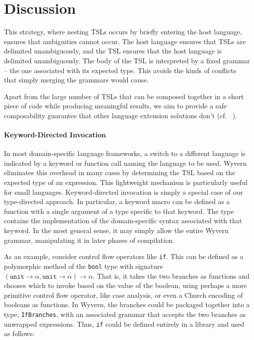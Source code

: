 
\section{Discussion}\label{s:discussion}

 This strategy, where nesting TSLs occurs by briefly entering the host language, ensures that ambiguities cannot occur. The host language ensures that TSLs are delimited unambiguously, and the TSL ensures that the host language is delimited unambiguously. The body of the TSL is interpreted by a fixed grammar -- the one associated with its expected type. This avoids the kinds of conflicts that simply merging the grammars would cause. %

Apart from the large number of TSLs that can be composed together in a short
piece of code while producing meaningful results, we aim to provide a safe
composability guarantee that other language extension solutions don't
(cf.~\cite{Erdweg:2013:FEL:2517208.2517210} ).

\paragraph{Keyword-Directed Invocation}

In most domain-specific language frameworks, a switch to a different language is indicated by a keyword or function call naming the language to be used. Wyvern eliminates this overhead in many cases by determining the TSL based on the expected type of an expression. This lightweight mechanism is particularly useful for small languages.
Keyword-directed invocation is simply a special case of our type-directed approach. In particular, a keyword macro can be defined as a function with a single argument of a type specific to that keyword. The type contains the implementation of the domain-specific syntax associated with that keyword. In the most general sense, it may simply allow the entire Wyvern
grammar, manipulating it in later phases of compilation. 

As an example, consider control flow operators like \verb|if|. This can be defined as a polymorphic method of the \verb|bool| type with signature $(\texttt{unit} \rightarrow \alpha, \texttt{unit} \rightarrow \alpha) \rightarrow \alpha$. That is, it takes the two branches as functions and chooses which to invoke based on the value of the boolean, using perhaps a more primitive control flow operator, like case analysis, or even a Church encoding of booleans as functions. In Wyvern, the branches could be packaged together into a type, \verb|IfBranches|, with an associated grammar that accepts the two branches as unwrapped expressions. Thus, \verb|if| could be defined entirely in a library and used as follows: 

